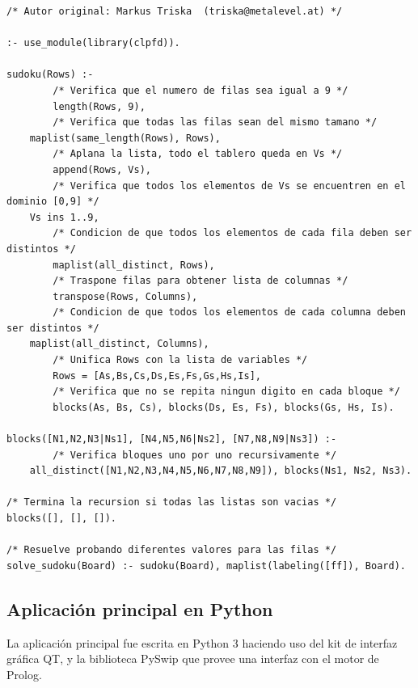 \documentclass[10pt,a4paper]{article}
\begin{document}
\begin{lstlisting}[style=myPrologstyle]
/* Autor original: Markus Triska  (triska@metalevel.at) */

:- use_module(library(clpfd)).

sudoku(Rows) :-
        /* Verifica que el numero de filas sea igual a 9 */
        length(Rows, 9),
        /* Verifica que todas las filas sean del mismo tamano */
	maplist(same_length(Rows), Rows),
        /* Aplana la lista, todo el tablero queda en Vs */
        append(Rows, Vs),
        /* Verifica que todos los elementos de Vs se encuentren en el dominio [0,9] */
	Vs ins 1..9,
        /* Condicion de que todos los elementos de cada fila deben ser distintos */
        maplist(all_distinct, Rows),
        /* Traspone filas para obtener lista de columnas */
        transpose(Rows, Columns),
        /* Condicion de que todos los elementos de cada columna deben ser distintos */
	maplist(all_distinct, Columns),
        /* Unifica Rows con la lista de variables */
        Rows = [As,Bs,Cs,Ds,Es,Fs,Gs,Hs,Is],
        /* Verifica que no se repita ningun digito en cada bloque */
        blocks(As, Bs, Cs), blocks(Ds, Es, Fs), blocks(Gs, Hs, Is).

blocks([N1,N2,N3|Ns1], [N4,N5,N6|Ns2], [N7,N8,N9|Ns3]) :-
        /* Verifica bloques uno por uno recursivamente */
	all_distinct([N1,N2,N3,N4,N5,N6,N7,N8,N9]), blocks(Ns1, Ns2, Ns3).

/* Termina la recursion si todas las listas son vacias */
blocks([], [], []).

/* Resuelve probando diferentes valores para las filas */
solve_sudoku(Board) :- sudoku(Board), maplist(labeling([ff]), Board).
\end{lstlisting}

\subsection{Aplicación principal en Python}
La aplicación principal fue escrita en Python 3 haciendo uso del kit de interfaz gráfica QT, y la biblioteca PySwip que provee una interfaz con el motor de Prolog.
\end{document}
